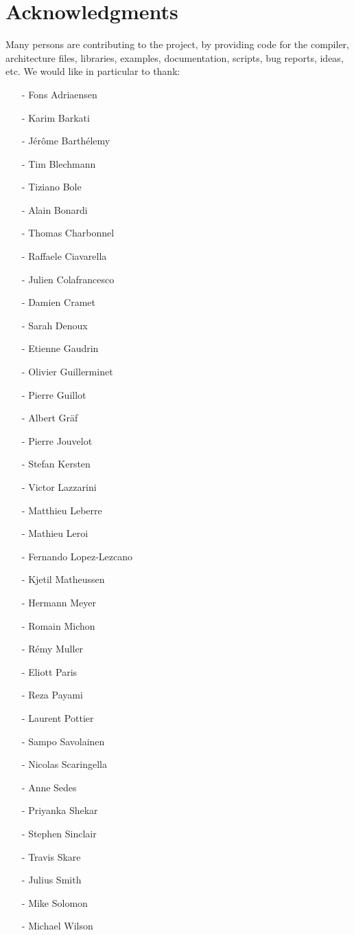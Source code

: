 \chapter{Acknowledgments}
\label{Acknowledgments}

Many persons are contributing to the \faust project, by providing code for the compiler, architecture files, libraries, examples, documentation, scripts, bug reports, ideas, etc. We would like in particular to thank:

\begin{itemize}
\setlength\itemsep{0em}
\item[-]Fons Adriaensen	
\item[-]Karim Barkati
\item[-]Jérôme Barthélemy
\item[-]Tim Blechmann
\item[-]Tiziano Bole	
\item[-]Alain Bonardi
\item[-]Thomas Charbonnel
\item[-]Raffaele Ciavarella
\item[-]Julien Colafrancesco
\item[-]Damien Cramet
\item[-]Sarah Denoux
\item[-]Etienne Gaudrin
\item[-]Olivier Guillerminet
\item[-]Pierre Guillot
\item[-]Albert Gräf
\item[-]Pierre Jouvelot
\item[-]Stefan Kersten
\item[-]Victor Lazzarini
\item[-]Matthieu Leberre
\item[-]Mathieu Leroi
\item[-]Fernando Lopez-Lezcano
\item[-]Kjetil Matheussen
\item[-]Hermann Meyer
\item[-]Romain Michon
\item[-]Rémy Muller
\item[-]Eliott Paris
\item[-]Reza Payami
\item[-]Laurent Pottier
\item[-]Sampo Savolainen
\item[-]Nicolas Scaringella
\item[-]Anne Sedes
\item[-]Priyanka Shekar
\item[-]Stephen Sinclair
\item[-]Travis Skare
\item[-]Julius Smith
\item[-]Mike Solomon
\item[-]Michael Wilson
\end{itemize}

